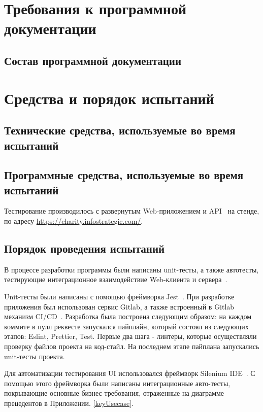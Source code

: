 \documentclass[a4paper,12pt,reqno]{article}
\begin{document}
    \section{Требования к программной документации}
	\subsection{Состав программной документации}
	
	
	\newpage
	\section{Средства и порядок испытаний}
	\subsection{Технические средства, используемые во время испытаний}
	
	\subsection{Программные средства, используемые во время испытаний}
	
	Тестирование производилось с развернутым Web-приложением и API~\cite{api} на стенде, по адресу \url{https://charity.infostrategic.com/}.
	
	
	\subsection{Порядок проведения испытаний}
	В процессе разработки программы были написаны unit-тесты, а также автотесты, тестирующие интеграционное взаимодействие Web-клиента и сервера~\cite{api}.
	
	Unit-тесты были написаны с помощью фреймворка Jest~\cite{jest}. При разработке приложения был использован сервис Gitlab, а также встроенный в Gitlab механизм CI/CD~\cite{cicd}. Разработка была построена следующим образом: на каждом коммите в пулл реквесте запускался пайплайн, который состоял из следующих этапов: Eslint, Prettier, Test. Первые два шага - линтеры, которые осуществляли проверку файлов проекта на код-стайл. На последнем этапе пайплана запускались unit-тесты проекта.
	
	Для автоматизации тестирования UI использовался фреймворк Silenium IDE~\cite{silenium}. С помощью этого фреймворка были написаны интеграционные авто-тесты, покрывающие основные бизнес-требования, отраженные на диаграмме прецедентов в Приложении. \ref{keyUsecase}.
	
\end{document}
